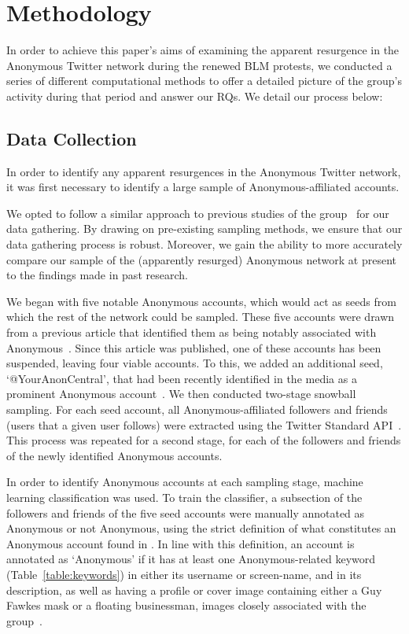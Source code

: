 \documentclass[letterpaper]{article}
\begin{document}
\section{Methodology}
\label{Method}

In order to achieve this paper's aims of examining the apparent resurgence in the Anonymous Twitter network during the renewed BLM protests, we conducted a series of different computational methods to offer a detailed picture of the group's activity during that period and answer our RQs. We detail our process below:

\subsection{Data Collection}

In order to identify any apparent resurgences in the Anonymous Twitter network, it was first necessary to identify a large sample of Anonymous-affiliated accounts.

We opted to follow a similar approach to previous studies of the group~\cite{Jones2020} for our data gathering. By drawing on pre-existing sampling methods, we ensure that our data gathering process is robust. Moreover, we gain the ability to more accurately compare our sample of the (apparently resurged) Anonymous network at present to the findings made in past research.

We began with five notable Anonymous accounts, which would act as seeds from which the rest of the network could be sampled. These five accounts were drawn from a previous article that identified them as being notably associated with Anonymous~\cite{Jones2020}. Since this article was published, one of these accounts has been suspended, leaving four viable accounts. To this, we added an additional seed, `@YourAnonCentral', that had been recently identified in the media as a prominent Anonymous account~\cite{AJC2020}.
We then conducted two-stage snowball sampling. For each seed account, all Anonymous-affiliated followers and friends (users that a given user follows)  were extracted using the Twitter Standard API~\cite{TwitterAPI}. This process was repeated for a second stage, for each of the followers and friends of the newly identified Anonymous accounts.

In order to identify Anonymous accounts at each sampling stage, machine learning classification was used. To train the classifier, a subsection of the followers and friends of the five seed accounts were manually annotated as Anonymous or not Anonymous, using the strict definition of what constitutes an Anonymous account found in \cite{Jones2020}. In line with this definition, an account is annotated as `Anonymous' if it has at least one Anonymous-related keyword (Table~\ref{table:keywords}) in either its username or screen-name, and in its description, as well as having a profile or cover image containing either a Guy Fawkes mask or a floating businessman, images closely associated with the group~\cite{Olson2013}.
\end{document}
